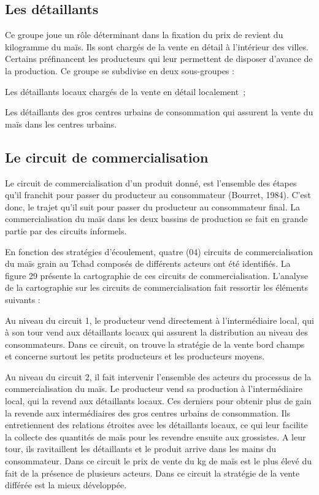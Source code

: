 \documentclass[12pt,oneside]{report}
\begin{document}
\subsection{Les détaillants}
Ce groupe joue un rôle déterminant dans la fixation du prix de revient du kilogramme du maïs. Ils sont chargés de la vente en détail à l’intérieur des villes. Certains préfinancent les producteurs qui leur permettent de disposer d’avance de la production. Ce groupe se subdivise en deux sous-groupes :

Les détaillants locaux chargés de la vente en détail localement ;

Les détaillants des gros centres urbains de consommation qui assurent la vente du maïs dans les centres urbains.

\subsection{Le circuit de commercialisation}
Le circuit de commercialisation d'un produit donné, est l'ensemble des étapes qu'il franchit pour passer du producteur au consommateur (Bourret, 1984). C'est donc, le trajet qu'il suit pour passer du producteur au consommateur final. La commercialisation du maïs dans les deux bassins de production se fait en grande partie par des circuits informels.

En fonction des stratégies d’écoulement, quatre (04) circuits de commercialisation du maïs grain au Tchad composés de différents acteurs ont été identifiés. La figure 29 présente la cartographie de ces circuits de commercialisation. L’analyse de la cartographie sur les circuits de commercialisation fait ressortir les éléments suivants :

Au niveau du circuit 1, le producteur vend directement à l’intermédiaire local, qui à son tour vend aux détaillants locaux qui assurent la distribution au niveau des consommateurs. Dans ce circuit, on trouve la stratégie de la vente bord champs et concerne surtout les petits producteurs et les producteurs moyens.

Au niveau du circuit 2, il fait intervenir l’ensemble des acteurs du processus de la commercialisation du maïs. Le producteur vend sa production à l’intermédiaire local, qui la revend aux détaillants locaux. Ces derniers pour obtenir plus de gain la revende aux intermédiaires des gros centres urbains de consommation. Ils entretiennent des relations étroites avec les détaillants locaux, ce qui leur facilite la collecte des quantités de maïs pour les revendre ensuite aux grossistes. A leur tour, ils ravitaillent les détaillants et le produit arrive dans les mains du consommateur. Dans ce circuit le prix de vente du kg de maïs est le plus élevé du fait de la présence de plusieurs acteurs. Dans ce circuit la stratégie de la vente différée est la mieux développée.
\end{document}
